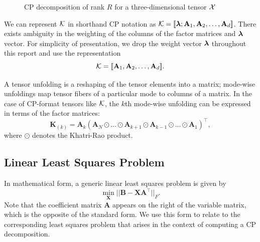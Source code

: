 \documentclass{article}
\newcommand{\mat}[1]{\mathbf{#1}}
\newcommand{\V}[2][]{\bm{#1{\mathbf{\MakeLowercase{#2}}}}} 		%
\newcommand{\T}[2][]{#1{\mathbf{\cal{#2}}}} 						%
\begin{document}
\begin{figure}[ht!]
\centering

\caption{CP decomposition of rank $R$ for a three-dimensional tensor $\T{X}$ \label{fig:3d-cp-decomp}}
\end{figure}
We can represent $\T[]{K}$ in shorthand CP notation as $\T{K} = [\![\V{\lambda};\mat{A}_1,\mat{A}_2, \dots,\mat{A}_d ]\!]$. 
There exists ambiguity in the weighting of the columns of the factor matrices and $\V{\lambda}$ vector.
For simplicity of presentation, we drop the weight vector $\V{\lambda}$ throughout this report and use the representation
$$\T{K} = [\![\mat{A}_1,\mat{A}_2, \dots,\mat{A}_d ]\!].$$

A tensor unfolding is a reshaping of the tensor elements into a matrix; mode-wise unfoldings map tensor fibers of a particular mode to columns of a matrix.
In the case of CP-format tensors like $\T{K}$, the $k$th mode-wise unfolding can be expressed in terms of the factor matrices:
$$\mat{K}_{(k)} = \mat{A}_k (\mat{A}_N \odot \dots \odot \mat{A}_{k+1} \odot \mat{A}_{k-1} \odot \dots \odot \mat{A}_1)^\top,$$
where $\odot$ denotes the Khatri-Rao product.

\subsection{Linear Least Squares Problem}
\label{sec:LS}

In mathematical form, a generic linear least squares problem is given by 
\begin{equation}
\label{eq:LS}
\min_{\mat{X}}||\mat{B} - \mat{X}\mat{A}^\top||_{F}.
\end{equation}
Note that the coefficient matrix $\mat{A}$ appears on the right of the variable matrix, which is the opposite of the standard form.
We use this form to relate to the corresponding least squares problem that arises in the context of computing a CP decomposition.
\end{document}
